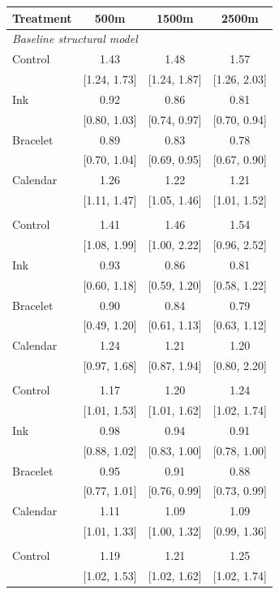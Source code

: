 \begin{tabular}{lccc}
\toprule
Treatment & 500m & 1500m & 2500m \\
\midrule
\multicolumn{4}{l}{\textit{Baseline structural model}} \\
Control & 1.43 & 1.48 & 1.57 \\
 & [1.24, 1.73] & [1.24, 1.87] & [1.26, 2.03] \\
Ink & 0.92 & 0.86 & 0.81 \\
 & [0.80, 1.03] & [0.74, 0.97] & [0.70, 0.94] \\
Bracelet & 0.89 & 0.83 & 0.78 \\
 & [0.70, 1.04] & [0.69, 0.95] & [0.67, 0.90] \\
Calendar & 1.26 & 1.22 & 1.21 \\
 & [1.11, 1.47] & [1.05, 1.46] & [1.01, 1.52] \\
\addlinespace
\multicolumn{4}{l}{\textit{Cluster bootstrap}} \\
Control & 1.41 & 1.46 & 1.54 \\
 & [1.08, 1.99] & [1.00, 2.22] & [0.96, 2.52] \\
Ink & 0.93 & 0.86 & 0.81 \\
 & [0.60, 1.18] & [0.59, 1.20] & [0.58, 1.22] \\
Bracelet & 0.90 & 0.84 & 0.79 \\
 & [0.49, 1.20] & [0.61, 1.13] & [0.63, 1.12] \\
Calendar & 1.24 & 1.21 & 1.20 \\
 & [0.97, 1.68] & [0.87, 1.94] & [0.80, 2.20] \\
\addlinespace
\multicolumn{4}{l}{\textit{Cluster random shock}} \\
Control & 1.17 & 1.20 & 1.24 \\
 & [1.01, 1.53] & [1.01, 1.62] & [1.02, 1.74] \\
Ink & 0.98 & 0.94 & 0.91 \\
 & [0.88, 1.02] & [0.83, 1.00] & [0.78, 1.00] \\
Bracelet & 0.95 & 0.91 & 0.88 \\
 & [0.77, 1.01] & [0.76, 0.99] & [0.73, 0.99] \\
Calendar & 1.11 & 1.09 & 1.09 \\
 & [1.01, 1.33] & [1.00, 1.32] & [0.99, 1.36] \\
\addlinespace
\multicolumn{4}{l}{\textit{Cluster random shock: prior SD 0.25}} \\
Control & 1.19 & 1.21 & 1.25 \\
 & [1.02, 1.53] & [1.02, 1.62] & [1.02, 1.74] \\

\end{tabular}
